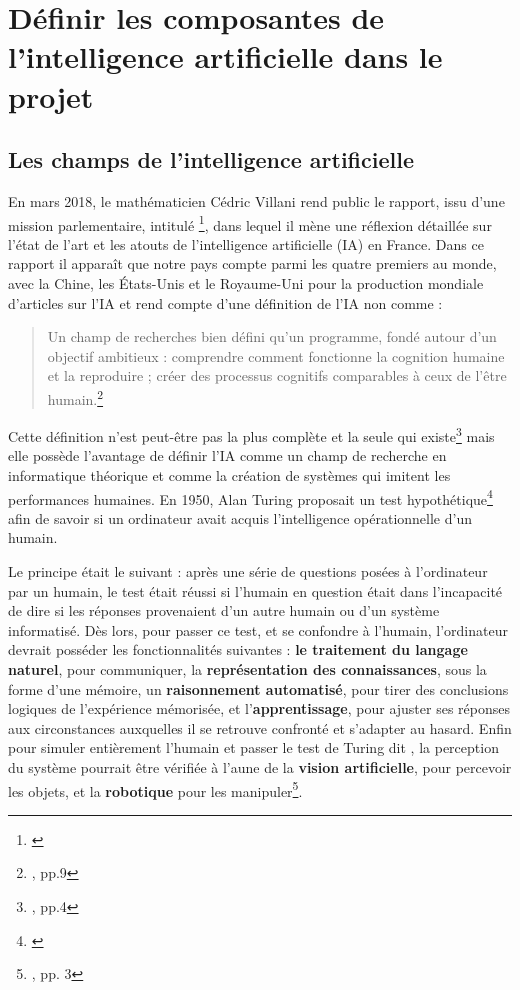\section{Définir les composantes de l'intelligence artificielle dans le projet}

\subsection{Les champs de l'intelligence artificielle}

En mars 2018, le mathématicien Cédric Villani rend public le rapport, issu d'une mission parlementaire, intitulé \footnote{\cite{noauthor_rapport_nodate}}, dans lequel il mène une réflexion détaillée sur l'état de l'art et les atouts de l'intelligence artificielle (IA) en France. Dans ce rapport il apparaît que notre pays compte parmi les quatre premiers au monde, avec la Chine, les États-Unis et le Royaume-Uni pour la production mondiale d'articles sur l'IA et rend compte d'une définition de l'IA non comme :
\begin{quote}
    Un champ de recherches bien défini qu'un programme, fondé autour d'un objectif ambitieux : comprendre comment fonctionne la cognition humaine et la reproduire ; créer des processus cognitifs comparables à ceux de l'être humain.\footnote{\cite{noauthor_rapport_nodate}, pp.9}
\end{quote}
Cette définition n'est peut-être pas la plus complète et la seule qui existe\footnote{\cite{russell_intelligence_2010}, pp.4} mais elle possède l'avantage de définir l'IA comme un champ de recherche en informatique théorique et comme la création de systèmes qui imitent les performances humaines. En 1950, Alan Turing proposait un test hypothétique\footnote{\cite{turing_computing_1950}} afin de savoir si un ordinateur avait acquis l'intelligence opérationnelle d'un humain. 

Le principe était le suivant : après une série de questions posées à l'ordinateur par un humain, le test était réussi si l'humain en question était dans l'incapacité de dire si les réponses provenaient d'un autre humain ou d'un système informatisé. Dès lors, pour passer ce test, et se confondre à l'humain, l'ordinateur devrait posséder les fonctionnalités suivantes : \textbf{le traitement du langage naturel}, pour communiquer, la \textbf{représentation des connaissances}, sous la forme d'une mémoire, un \textbf{raisonnement automatisé}, pour tirer des conclusions logiques de l'expérience mémorisée, et l'\textbf{apprentissage}, pour ajuster ses réponses aux circonstances auxquelles il se retrouve confronté et s'adapter au hasard. Enfin pour simuler entièrement l'humain et passer le test de Turing dit , la perception du système pourrait être vérifiée à l'aune de la \textbf{vision artificielle}, pour percevoir les objets, et la \textbf{robotique} pour les manipuler\footnote{\cite{russell_intelligence_2010}, pp. 3}.\\

